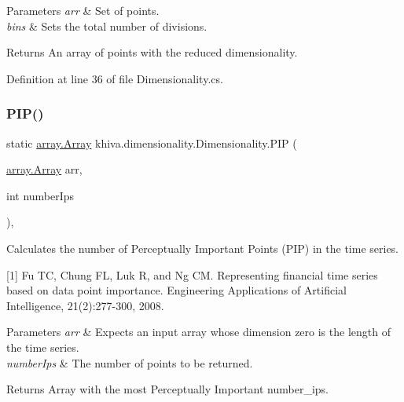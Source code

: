\begin{DoxyParams}{Parameters}
{\em arr} & Set of points.\\
\hline
{\em bins} & Sets the total number of divisions.\\
\hline
\end{DoxyParams}
\begin{DoxyReturn}{Returns}
An array of points with the reduced dimensionality.
\end{DoxyReturn}


Definition at line 36 of file Dimensionality.\+cs.

\mbox{\label{classkhiva_1_1dimensionality_1_1_dimensionality_a0e27cdaf20c83fd722198b297357ec8b}} 
\subsubsection{\texorpdfstring{P\+I\+P()}{PIP()}}
{\footnotesize\ttfamily static \mbox{\hyperlink{classkhiva_1_1array_1_1_array}{array.\+Array}} khiva.\+dimensionality.\+Dimensionality.\+P\+IP (\begin{DoxyParamCaption}\item[{\mbox{\hyperlink{classkhiva_1_1array_1_1_array}{array.\+Array}}}]{arr,  }\item[{int}]{number\+Ips }\end{DoxyParamCaption})\hspace{0.3cm}{\ttfamily [inline]}, {\ttfamily [static]}}



Calculates the number of Perceptually Important Points (P\+IP) in the time series. 

\mbox{[}1\mbox{]} Fu TC, Chung FL, Luk R, and Ng CM. Representing financial time series based on data point importance. Engineering Applications of Artificial Intelligence, 21(2)\+:277-\/300, 2008. 


\begin{DoxyParams}{Parameters}
{\em arr} & Expects an input array whose dimension zero is the length of the time series.\\
\hline
{\em number\+Ips} & The number of points to be returned.\\
\hline
\end{DoxyParams}
\begin{DoxyReturn}{Returns}
Array with the most Perceptually Important number\+\_\+ips.
\end{DoxyReturn}


